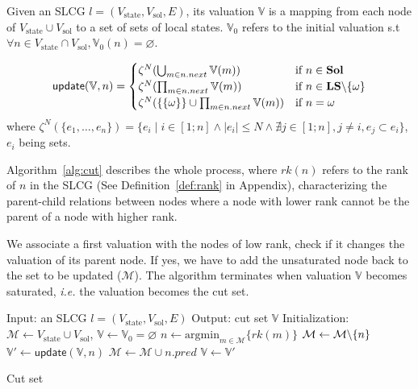 \begin{definition}[Valuation]\label{def:valuation}
Given an SLCG $l= (V_{\mathrm{state}},V_{\mathrm{sol}},E)$, its valuation $\mathbb{V}$ is a mapping from each node of $V_{\mathrm{state}}\cup V_{\mathrm{sol}}$ to a set of sets of local states.
$\mathbb{V}_0$ refers to the initial valuation s.t $\forall n \in V_{\mathrm{state}}\cap V_{\mathrm{sol}}, \mathbb{V}_0(n)=\varnothing$.
\end{definition}


\begin{definition}
\begin{equation}  
\mathsf{update}(\mathbb{V},n)= 
      \begin{cases}
            \zeta^N(\bigcup_{m\in n.next}\mathbb{V}(m))&\text{if } n\in\mathbf{Sol}\\
            \zeta^N(\prod_{m\in n.next}\mathbb{V}(m))&\text{if } n\in\mathbf{LS}\miset{\omega}\\
            \zeta^N(\{\{\omega\}\}\cup\prod_{m\in n.next}\mathbb{V}(m))&\text{if }n=\omega\\
      \end{cases}
\end{equation}
where $\zeta^N(\{e_1,\ldots,e_n\})=\{e_i\mid i\in[1;n]\land |e_i|\leq N\land\nexists j\in[1;n],j\neq i,e_j\subset e_i\}$, $e_i$ being sets.
\end{definition}

Algorithm~\ref{alg:cut} describes the whole process, where $rk(n)$ refers to the rank of $n$ in the SLCG (See Definition~\ref{def:rank} in Appendix), characterizing the parent-child relations between nodes where a node with lower rank cannot be the parent of a node with higher rank.

We associate a first valuation with the nodes of low rank, check if it changes the valuation of its parent node.
If yes, we have to add the unsaturated node back to the set to be updated ($\mathcal{M}$).
The algorithm terminates when valuation $\mathbb{V}$ becomes saturated, \textit{i.e.} the valuation becomes the cut set.

\begin{algorithm}[ht]
\begin{algorithmic}
\State Input: an SLCG $l= (V_{\mathrm{state}},V_{\mathrm{sol}},E)$
\State Output: cut set $\mathbb{V}$
\State Initialization: $\mathcal{M}\gets V_{\mathrm{state}}\cup V_{\mathrm{sol}}$, $\mathbb{V}\gets\mathbb{V}_0=\varnothing$
        \State $n\gets\mathrm{argmin}_{m\in\mathcal{M}}\{rk(m)\}$
		\State $\mathcal{M}\gets\mathcal{M}\miset{n}$
		\State $\mathbb{V}'\gets\mathsf{update}(\mathbb{V},n)$
		    \State $\mathcal{M}\gets\mathcal{M}\cup n.pred$
		\EndIf
		\State $\mathbb{V}\gets\mathbb{V}'$
\EndWhile
\State {} 
\end{algorithmic}
\caption{Cut set}\label{alg:cut}
\end{algorithm}

